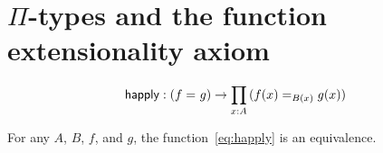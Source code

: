 \documentclass[hott-all.tex]{subfiles}
\begin{document}
\section{\texorpdfstring{$\Pi$}{Π}-types and the function extensionality axiom}
\label{sec:compute-pi}
%
%
\begin{equation}\label{eq:happly}
  \happly : (\id{f}{g}) \to \prd{x:A} (\id[B(x)]{f(x)}{g(x)})
\end{equation}
%
\begin{axiom}\label{axiom:funext}
  For any $A$, $B$, $f$, and $g$, the function~\eqref{eq:happly} is an equivalence.
\end{axiom}
\end{document}
